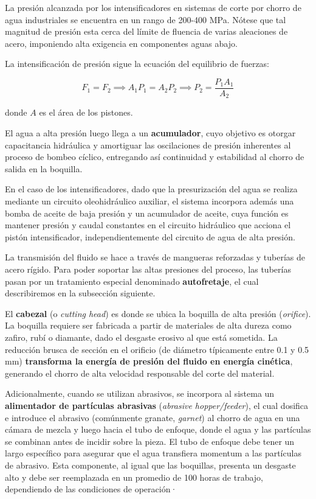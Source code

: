 La presión alcanzada por los intensificadores en sistemas de corte por chorro de agua industriales se encuentra en un rango de 200-400 MPa. Nótese que tal magnitud de presión esta cerca del límite de fluencia de varias aleaciones de acero, imponiendo alta exigencia en componentes aguas abajo.

La intensificación de presión sigue la ecuación del equilibrio de fuerzas:

\begin{equation}
	F_{1}=F_{2} \implies A_{1}P_{1}=A_{2}P_{2} \implies P_{2}=\frac{P_{1}A_{1}}{A_{2}}
	\label{eq:pres}
\end{equation}

donde $A$ es el área de los pistones.

El agua a alta presión luego llega a un \textbf{acumulador}, cuyo objetivo es otorgar capacitancia hidráulica y amortiguar las oscilaciones de presión inherentes al proceso de bombeo cíclico, entregando así continuidad y estabilidad al chorro de salida en la boquilla.

En el caso de los intensificadores, dado que la presurización del agua se realiza mediante un circuito oleohidráulico auxiliar, el sistema incorpora además una bomba de aceite de baja presión y un acumulador de aceite, cuya función es mantener presión y caudal constantes en el circuito hidráulico que acciona el pistón intensificador, independientemente del circuito de agua de alta presión.

La transmisión del fluido se hace a través de mangueras reforzadas y tuberías de acero rígido. Para poder soportar las altas presiones del proceso, las tuberías pasan por un tratamiento especial denominado \textbf{autofretaje}, el cual describiremos en la subsección siguiente.

El \textbf{cabezal} (o \textit{cutting head}) es donde se ubica la boquilla de alta presión (\textit{orifice}). La boquilla requiere ser fabricada a partir de materiales de alta dureza como zafiro, rubí o diamante, dado el desgaste erosivo al que está sometida. La reducción brusca de sección en el orificio (de diámetro típicamente entre 0.1 y 0.5 mm) \textbf{transforma la energía de presión del fluido en energía cinética}, generando el chorro de alta velocidad responsable del corte del material.

Adicionalmente, cuando se utilizan abrasivos, se incorpora al sistema un \textbf{alimentador de partículas abrasivas} (\textit{abrasive hopper/feeder}), el cual dosifica e introduce el abrasivo (comúnmente granate, \textit{garnet}) al chorro de agua en una cámara de mezcla y luego hacia el tubo de enfoque, donde el agua y las partículas se combinan antes de incidir sobre la pieza. El tubo de enfoque debe tener un largo específico para asegurar que el agua transfiera momentum a las partículas de abrasivo. Esta componente, al igual que las boquillas, presenta un desgaste alto y debe ser reemplazada en un promedio de 100 horas de trabajo, dependiendo de las condiciones de operación·

